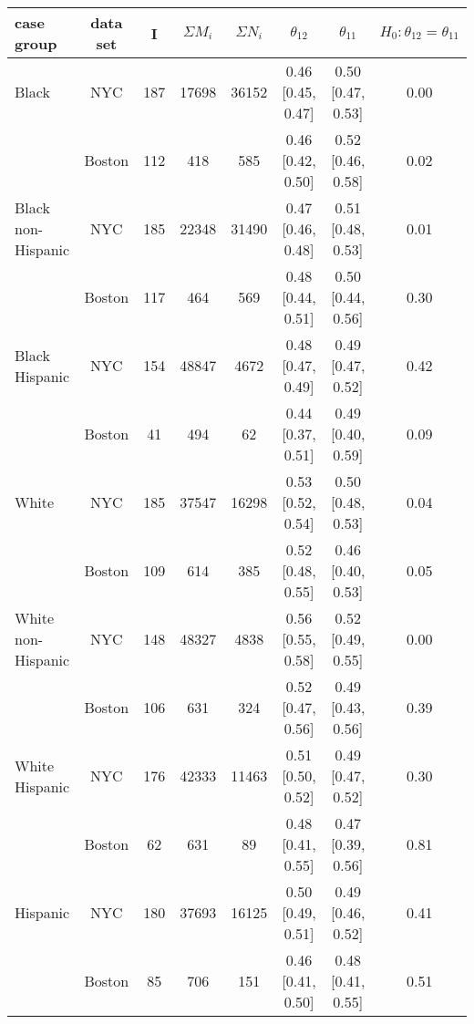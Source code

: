 \begin{tabular}{|l||c|c|c|c|c|c|c|}
  \hline
case group & data set & I & $\Sigma M_i$ & $\Sigma N_i$ & $\theta_{12}$ & $\theta_{11}$ & $H_{0}:\theta_{12}=\theta_{11}$ \\ 
  \hline
 \hline
Black & NYC & 187 & 17698 & 36152 & 0.46 [0.45, 0.47] & 0.50 [0.47, 0.53] & 0.00 \\ 
   & Boston & 112 & 418 & 585 & 0.46 [0.42, 0.50] & 0.52 [0.46, 0.58] & 0.02 \\ 
  Black non-Hispanic & NYC & 185 & 22348 & 31490 & 0.47 [0.46, 0.48] & 0.51 [0.48, 0.53] & 0.01 \\ 
   & Boston & 117 & 464 & 569 & 0.48 [0.44, 0.51] & 0.50 [0.44, 0.56] & 0.30 \\ 
  Black Hispanic & NYC & 154 & 48847 & 4672 & 0.48 [0.47, 0.49] & 0.49 [0.47, 0.52] & 0.42 \\ 
   & Boston & 41 & 494 & 62 & 0.44 [0.37, 0.51] & 0.49 [0.40, 0.59] & 0.09 \\ 
  White & NYC & 185 & 37547 & 16298 & 0.53 [0.52, 0.54] & 0.50 [0.48, 0.53] & 0.04 \\ 
   & Boston & 109 & 614 & 385 & 0.52 [0.48, 0.55] & 0.46 [0.40, 0.53] & 0.05 \\ 
  White non-Hispanic & NYC & 148 & 48327 & 4838 & 0.56 [0.55, 0.58] & 0.52 [0.49, 0.55] & 0.00 \\ 
   & Boston & 106 & 631 & 324 & 0.52 [0.47, 0.56] & 0.49 [0.43, 0.56] & 0.39 \\ 
  White Hispanic & NYC & 176 & 42333 & 11463 & 0.51 [0.50, 0.52] & 0.49 [0.47, 0.52] & 0.30 \\ 
   & Boston & 62 & 631 & 89 & 0.48 [0.41, 0.55] & 0.47 [0.39, 0.56] & 0.81 \\ 
  Hispanic & NYC & 180 & 37693 & 16125 & 0.50 [0.49, 0.51] & 0.49 [0.46, 0.52] & 0.41 \\ 
   & Boston & 85 & 706 & 151 & 0.46 [0.41, 0.50] & 0.48 [0.41, 0.55] & 0.51 \\ 
   \hline
\end{tabular}
